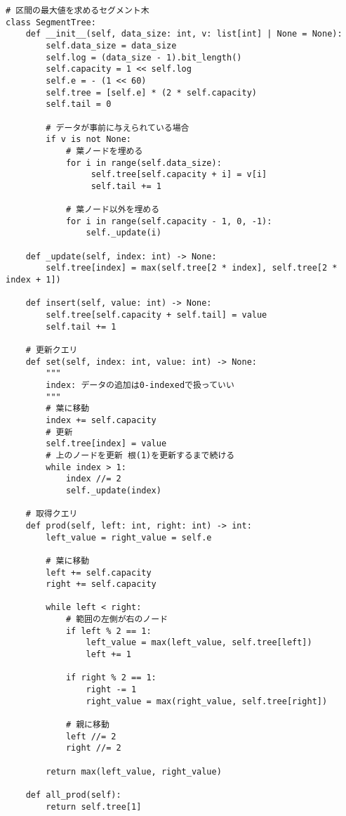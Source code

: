 \begin{lstlisting}[caption=セグメント木の実装, label=segment, frame=TRBL, label={segment}]
# 区間の最大値を求めるセグメント木
class SegmentTree:
    def __init__(self, data_size: int, v: list[int] | None = None):
        self.data_size = data_size
        self.log = (data_size - 1).bit_length()
        self.capacity = 1 << self.log
        self.e = - (1 << 60)
        self.tree = [self.e] * (2 * self.capacity)
        self.tail = 0

        # データが事前に与えられている場合
        if v is not None:
            # 葉ノードを埋める
            for i in range(self.data_size):
                 self.tree[self.capacity + i] = v[i]
                 self.tail += 1
                 
            # 葉ノード以外を埋める 
            for i in range(self.capacity - 1, 0, -1):
                self._update(i)
    
    def _update(self, index: int) -> None:
        self.tree[index] = max(self.tree[2 * index], self.tree[2 * index + 1])

    def insert(self, value: int) -> None:
        self.tree[self.capacity + self.tail] = value
        self.tail += 1

    # 更新クエリ
    def set(self, index: int, value: int) -> None:
        """
		index: データの追加は0-indexedで扱っていい
		"""
        # 葉に移動 
        index += self.capacity
        # 更新
        self.tree[index] = value
        # 上のノードを更新 根(1)を更新するまで続ける
        while index > 1:
            index //= 2
            self._update(index)
            
    # 取得クエリ
    def prod(self, left: int, right: int) -> int:
        left_value = right_value = self.e
        
        # 葉に移動
        left += self.capacity
        right += self.capacity
        
        while left < right:
            # 範囲の左側が右のノード
            if left % 2 == 1:
                left_value = max(left_value, self.tree[left])
                left += 1
            
            if right % 2 == 1:
                right -= 1
                right_value = max(right_value, self.tree[right])
                
            # 親に移動
            left //= 2 
            right //= 2
        
        return max(left_value, right_value)

    def all_prod(self):
        return self.tree[1]
\end{lstlisting}

